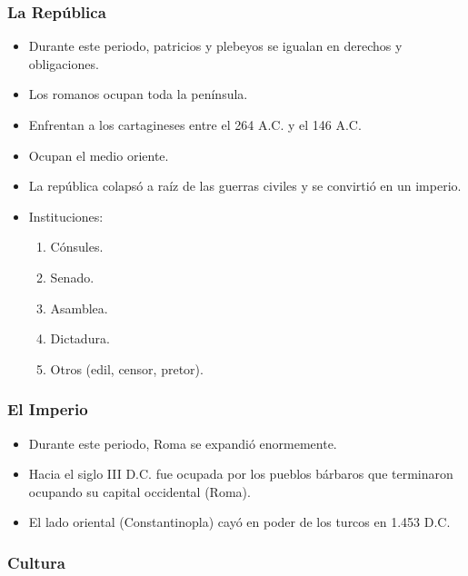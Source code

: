 \subsubsection{La República}

\begin{itemize}

\item Durante este periodo, patricios y plebeyos se igualan en derechos y obligaciones.

\item Los romanos ocupan toda la península.

\item Enfrentan a los cartagineses entre el 264 A.C. y el 146 A.C.

\item Ocupan el medio oriente.

\item La república colapsó a raíz de las guerras civiles y se convirtió en un imperio.

\item Instituciones:
\begin{enumerate}
	\item Cónsules.
	\item Senado.
	\item Asamblea.
	\item Dictadura.
	\item Otros (edil, censor, pretor).
\end{enumerate}

\end{itemize}

\subsubsection{El Imperio}

\begin{itemize}

\item Durante este periodo, Roma se expandió enormemente.

\item Hacia el siglo III D.C. fue ocupada por los pueblos bárbaros que terminaron ocupando su capital occidental (Roma).

\item El lado oriental (Constantinopla) cayó en poder de los turcos en 1.453 D.C.

\end{itemize}

\subsubsection{Cultura}

